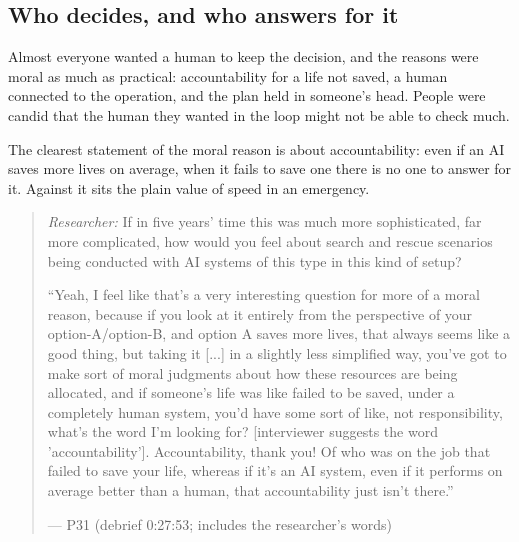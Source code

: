 

\subsection{Who decides, and who answers for it}\label{sec:qual:who-decides}

Almost everyone wanted a human to keep the decision, and the reasons were moral as much as practical: accountability for a life not saved, a human connected to the operation, and the plan held in someone's head. People were candid that the human they wanted in the loop might not be able to check much.


\label{sec:qual:who-decides:accountability}
The clearest statement of the moral reason is about accountability: even if an AI saves more lives on average, when it fails to save one there is no one to answer for it. Against it sits the plain value of speed in an emergency.

\begin{quote}\small
{\footnotesize\textit{Researcher:} If in five years' time this was much more sophisticated, far more complicated, how would you feel about search and rescue scenarios being conducted with AI systems of this type in this kind of setup?}\par\smallskip
``Yeah, I feel like that's a very interesting question for more of a moral reason, because if you look at it entirely from the perspective of your option-A/option-B, and option A saves more lives, that always seems like a good thing, but taking it [...] in a slightly less simplified way, you've got to make sort of moral judgments about how these resources are being allocated, and if someone's life was like failed to be saved, under a completely human system, you'd have some sort of like, not responsibility, what's the word I'm looking for? [interviewer suggests the word 'accountability']. Accountability, thank you! Of who was on the job that failed to save your life, whereas if it's an AI system, even if it performs on average better than a human, that accountability just isn't there.''\par\hfill--- P31 (debrief 0:27:53; includes the researcher's words)
\end{quote}


